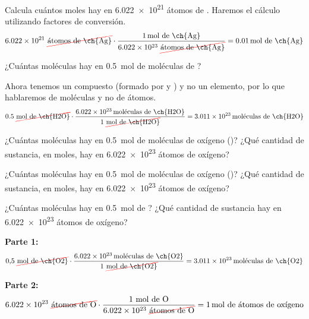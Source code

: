 \begin{example}{}
    Calcula cuántos moles hay en \num{6.022e21} átomos de . Haremos el cálculo utilizando factores de conversión.
    \begin{equation*}
        \num{6.022e21}\ \cancelred{\text{átomos de \ch{Ag}}} \cdot \dfrac{\qty{1}{\mole}\ \text{de \ch{Ag}}}{\num{6.022e23}\ \cancelred{\text{átomos de \ch{Ag}}}} = \qty{0.01}{\mol}\ \text{de \ch{Ag}}
    \end{equation*}
\end{example}

\begin{example}{}
    ¿Cuántas moléculas hay en \qty{0.5}{\mole} de moléculas de ?

    Ahora tenemos un compuesto (formado por  y ) y no un elemento, por lo que hablaremos de moléculas y no de átomos.
    \begin{equation*}
        0.5\ \cancelred{\unit{\mole}\ \text{de \ch{H2O}}} \cdot \dfrac{\qty{6.022e23}{\text{moléculas}}\ \text{de \ch{H2O}}}{1\ \cancelred{\unit{\mole} \ \text{de \ch{H2O}}}} = \qty{3.011e23}{\text{moléculas}}\ \text{de \ch{H2O}}
    \end{equation*}
\end{example}



\begin{exercise}
    ¿Cuántas moléculas hay en \qty{0.5}{\mole} de moléculas de oxígeno ()? ¿Qué cantidad de sustancia, en moles, hay en \num{6.022e23} átomos de oxígeno?
    \begin{solu}
        ¿Cuántas moléculas hay en \qty{0.5}{\mole} de moléculas de oxígeno ()? ¿Qué cantidad de sustancia, en moles, hay en \num{6.022e23} átomos de oxígeno?

        ¿Cuántas moléculas hay en \qty{0.5}{\mole} de ? ¿Qué cantidad de sustancia hay en \num{6.022e23} átomos de oxígeno?

        \textbf{Parte 1:}
        \begin{equation*}
            0{,}5\ \cancelred{\unit{\mole}\ \text{de \ch{O2}}} \cdot \dfrac{\qty{6.022e23}{\text{moléculas de \ch{O2}}}}{1\ \cancelred{\unit{\mole}\ \text{de \ch{O2}}}} = \qty{3.011e23}{\text{moléculas de \ch{O2}}}
        \end{equation*}

        \textbf{Parte 2:}
        \begin{equation*}
            \num{6.022e23}\ \cancelred{\text{átomos de O}} \cdot \dfrac{1\ \unit{\mole}\ \text{de O}}{\num{6.022e23}\ \cancelred{\text{átomos de O}}} = \qty{1}{\mole}\ \text{de átomos de oxígeno}
        \end{equation*}
    \end{solu}
\end{exercise}

